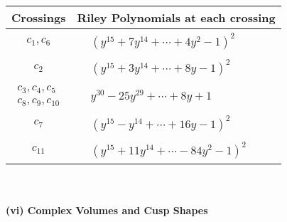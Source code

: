 \documentclass[1p]{elsarticle_modified}
\theoremstyle{definition}
\begin{document}
\begin{tabular}{m{50pt}|m{274pt}}
Crossings & \hspace{64pt}Riley Polynomials at each crossing \\
\hline $$\begin{aligned}c_{1},c_{6}\end{aligned}$$&$\begin{aligned}
&(y^{15}+7 y^{14}+\cdots+4 y^2-1)^{2}
\end{aligned}$\\
\hline $$\begin{aligned}c_{2}\end{aligned}$$&$\begin{aligned}
&(y^{15}+3 y^{14}+\cdots+8 y-1)^{2}
\end{aligned}$\\
\hline $$\begin{aligned}c_{3},c_{4},c_{5}\\c_{8},c_{9},c_{10}\end{aligned}$$&$\begin{aligned}
&y^{30}-25 y^{29}+\cdots+8 y+1
\end{aligned}$\\
\hline $$\begin{aligned}c_{7}\end{aligned}$$&$\begin{aligned}
&(y^{15}- y^{14}+\cdots+16 y-1)^{2}
\end{aligned}$\\
\hline $$\begin{aligned}c_{11}\end{aligned}$$&$\begin{aligned}
&(y^{15}+11 y^{14}+\cdots-84 y^2-1)^{2}
\end{aligned}$\\
\hline
\end{tabular}\\~\\
\newpage\flushleft \textbf{(vi) Complex Volumes and Cusp Shapes}
\end{document}
